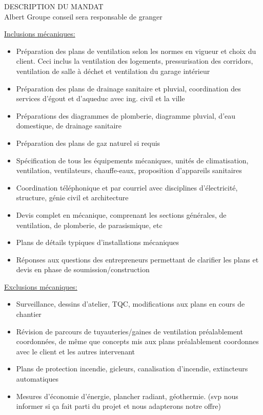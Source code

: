 DESCRIPTION DU MANDAT\\ Albert Groupe conseil sera responsable de granger\par\underline{Inclusions mécaniques:}\begin{itemize} \item[\textbullet] Préparation des plans de ventilation selon les normes en vigueur et choix du client. Ceci inclus la ventilation des logements, pressurisation des corridors, ventilation de salle à déchet et ventilation du garage intérieur\item[\textbullet] Préparation des plans de drainage sanitaire et pluvial, coordination des services d'égout et d'aqueduc avec ing. civil et la ville\item[\textbullet] Préparations des diagrammes de plomberie, diagramme pluvial, d’eau domestique, de drainage sanitaire\item[\textbullet] Préparation des plans de gaz naturel si requis\item[\textbullet] Spécification de tous les équipements mécaniques, unités de climatisation, ventilation, ventilateurs, chauffe-eaux, proposition d'appareils sanitaires\item[\textbullet] Coordination téléphonique et par courriel avec disciplines d'électricité, structure, génie civil et architecture\item[\textbullet] Devis complet en mécanique, comprenant les sections générales, de ventilation, de plomberie, de parasismique, etc\item[\textbullet] Plans de détails typiques d’installations mécaniques\item[\textbullet] Réponses aux questions des entrepreneurs permettant de clarifier les plans et devis en phase de soumission/construction\end{itemize}\par\underline{Exclusions mécaniques:}\begin{itemize} \item[\textbullet] Surveillance, dessins d'atelier, TQC, modifications aux plans en cours de chantier\item[\textbullet] Révision de parcours de tuyauteries/gaines de ventilation préalablement coordonnées, de même que concepts mis aux plans préalablement coordonnes avec le client et les autres intervenant\item[\textbullet] Plans de protection incendie, gicleurs, canalisation d’incendie, extincteurs automatiques\item[\textbullet] Mesures d’économie d’énergie, plancher radiant, géothermie. (svp nous informer si ça fait parti du projet et nous adapterons notre offre)\end{itemize}